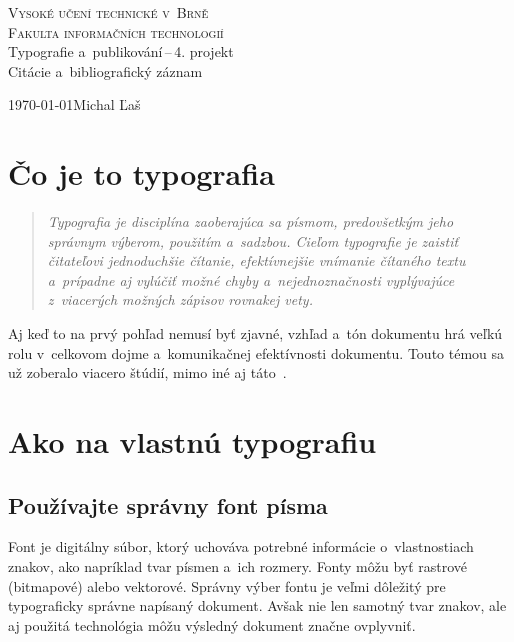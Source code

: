 \documentclass[a4paper, 11pt, a4paper]{article}
\begin{document}
\begin{titlepage}
    \begin{center}
            \textsc{\Huge Vysoké učení technické v~Brně \\}
            \vspace{0.5em}
            \textsc{\huge Fakulta informačních technologií \\}
            {\LARGE Typografie a~publikování\,--\,4. projekt \\ 
            \vspace{0.4em}
            \Huge Citácie a~bibliografický záznam}
    \end{center}
    {\Large \today \hfill Michal Ľaš}
\end{titlepage}


\section{Čo je to typografia}

\begin{quotation}
    \emph{Typografia je disciplína zaoberajúca sa písmom, predovšetkým jeho správnym výberom, použitím a~sadzbou. Cieľom typografie je zaistiť čitateľovi jednoduchšie čítanie, efektívnejšie vnímanie čítaného textu a~prípadne aj vylúčiť možné chyby a~nejednoznačnosti vyplývajúce z~viacerých možných zápisov rovnakej vety.}~\cite{Strafelda.Typografie.2020}
\end{quotation}

Aj keď to na prvý pohľad nemusí byť zjavné, vzhľad a~tón dokumentu hrá veľkú rolu v~celkovom dojme a~komunikačnej efektívnosti dokumentu. Touto témou sa už zoberalo viacero štúdií, mimo iné aj táto~\cite{EvansM.B.2004Teos}.

\section{Ako na vlastnú typografiu}

\subsection{Používajte správny font písma}

Font je digitálny súbor, ktorý uchováva potrebné informácie o~vlastnostiach znakov, ako napríklad tvar písmen a~ich rozmery. Fonty môžu byť rastrové (bitmapové) alebo vektorové. Správny výber fontu je veľmi dôležitý pre typograficky správne napísaný dokument. Avšak nie len samotný tvar znakov, ale aj použitá technológia môžu výsledný dokument značne ovplyvniť.~\cite{typo.Zelenka.fonty.2003}
\end{document}
